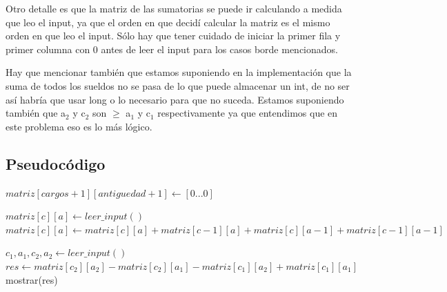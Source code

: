 Otro detalle es que la matriz de las sumatorias se puede ir calculando a medida que leo el input, ya que el orden en que decidí calcular la matriz es el mismo orden en que leo el input. Sólo hay que tener cuidado de iniciar la primer fila y primer columna con 0 antes de leer el input para los casos borde mencionados. \newline

Hay que mencionar también que estamos suponiendo en la implementación que la suma de todos los sueldos no se pasa de lo que puede almacenar un int, de no ser así habría que usar long o lo necesario para que no suceda. Estamos suponiendo también que a$_2$ y c$_2$ son $\geq$ a$_1$ y c$_1$ respectivamente ya que entendimos que en este problema eso es lo más lógico.

\subsection {Pseudocódigo}

\begin{algorithmic}

	\State $matriz[cargos + 1][antiguedad + 1] \gets [0...0]$ 

			\State $matriz[c][a] \gets leer\_input()$
			\State $matriz[c][a] \gets matriz[c][a] + matriz[c - 1][a] + matriz[c][a - 1] + matriz[c - 1][a - 1]$
		\EndFor
	\EndFor

		\State $c_1, a_1, c_2, a_2 \gets leer\_input()$
		\State $res \gets matriz[c_2][a_2] - matriz[c_2][a_1] - matriz[c_1][a_2] + matriz[c_1][a_1]$
		\State mostrar(res)
	\EndFor

\end{algorithmic}